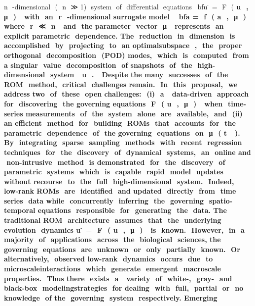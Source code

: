 \documentclass{article}
\begin{document}
n ​ -dimensional​ ​ ( ​ n ​ ≫ 1)​ ​ system​ ​ of​ ​ differential​ ​ equations​ \ ​ bfu ̇ = ​ F ​ (\bf​ u ​ , ​ μ ​ ) ​ ​ with​ ​ an​ ​ r ​ -dimensional
surrogate​ ​ model​ \ ​ bfa = ​ f ​ (\bf​ a ​ , ​ μ ​ ) ​ ​ where​ ​ r ​ ≪ ​ n ​ ​ and​ ​ the​ ​ parameter​ ​ vector​ ​ μ ​ ​ represents​ ​ an​ ​ explicit
parametric​ ​ dependence.​ ​ The​ ​ reduction​ ​ in​ ​ dimension​ ​ is​ ​ accomplished​ ​ by​ ​ projecting​ ​ to​ ​ an​ ​ optimalsubspace​ ​ ,​ ​ the​ ​ proper​ ​ orthogonal​ ​ decomposition​ ​ (POD)​ ​ modes,​ ​ which​ ​ is​ ​ computed​ ​ from​ ​ a
singular​ ​ value​ ​ decomposition​ ​ of​ ​ snapshots​ ​ of​ ​ the​ ​ high-dimensional​ ​ system​ ​ \bf​ u ​ . ​ ​ Despite​ ​ the
many​ ​ successes​ ​ of​ ​ the​ ​ ROM​ ​ method,​ ​ critical​ ​ challenges​ ​ remain.​ ​ In​ ​ this​ ​ proposal,​ ​ we​ ​ address
two​ ​ of​ ​ these​ ​ open​ ​ challenges:​ ​ (i)​ ​ a ​ ​ data-driven​ ​ approach​ ​ for​ ​ discovering​ ​ the​ ​ governing
equations​ ​ F ​ (\bf​ u ​ , ​ μ ​ ) ​ ​ when​ ​ time-series​ ​ measurements​ ​ of​ ​ the​ ​ system​ ​ alone​ ​ are​ ​ available,​ ​ and​ ​ (ii)
an​ ​ efficient​ ​ method​ ​ for​ ​ building​ ​ ROMs​ ​ that​ ​ accounts​ ​ for​ ​ the​ ​ parametric​ ​ dependence​ ​ of​ ​ the
governing​ ​ equations​ ​ on​ ​ μ ​ ( t ​ ​ ).​ ​ By​ ​ integrating​ ​ sparse​ ​ sampling​ ​ methods​ ​ with​ ​ recent​ ​ regression
techniques​ ​ for​ ​ the​ ​ discovery​ ​ of​ ​ dynamical​ ​ systems,​ ​ an​ ​ online​ ​ and​ ​ non-intrusive​ ​ method​ ​ is
demonstrated​ ​ for​ ​ the​ ​ discovery​ ​ of​ ​ parametric​ ​ systems​ ​ which​ ​ is​ ​ capable​ ​ rapid​ ​ model​ ​ updates
without​ ​ recourse​ ​ to​ ​ the​ ​ full​ ​ high-dimensional​ ​ system.​ ​ Indeed,​ ​ low-rank​ ​ ROMs​ ​ are​ ​ identified​ ​ and
updated​ ​ directly​ ​ from​ ​ time​ ​ series​ ​ data​ ​ while​ ​ concurrently​ ​ inferring​ ​ the​ ​ governing​ ​ spatio-temporal
equations​ ​ responsible​ ​ for​ ​ generating​ ​ the​ ​ data.
The​ ​ traditional​ ​ ROM​ ​ architecture​ ​ assumes​ ​ that​ ​ the​ ​ underlying​ ​ evolution​ ​ dynamics
\bf u ̇ = ​ F ​ (\bf​ u ​ , ​ μ ​ ) ​ ​ is​ ​ known.​ ​ However,​ ​ in​ ​ a ​ ​ majority​ ​ of​ ​ applications​ ​ across​ ​ the​ ​ biological​ ​ sciences,
the​ ​ governing​ ​ equations​ ​ are​ ​ unknown​ ​ or​ ​ only​ ​ partially​ ​ known.​ ​ Or​ ​ alternatively,​ ​ observed
low-rank​ ​ dynamics​ ​ occurs​ ​ due​ ​ to​ ​ microscale​ ​ interactions​ ​ which​ ​ generate​ ​ emergent​ ​ macroscale
properties.​ ​ Thus​ ​ there​ ​ exists​ ​ a ​ ​ variety​ ​ of​ ​ white-,​ ​ gray-​ ​ and​ ​ black-box​ ​ modeling​ ​ strategies​ ​ for
dealing​ ​ with​ ​ full,​ ​ partial​ ​ or​ ​ no​ ​ knowledge​ ​ of​ ​ the​ ​ governing​ ​ system​ ​ respectively.​ ​ Emerging
\end{document}
